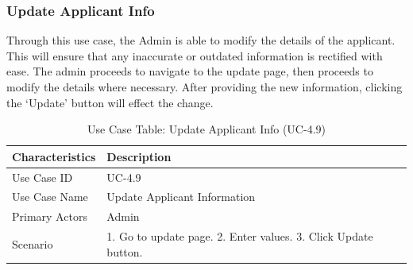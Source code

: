 \subsubsection{Update Applicant Info}
Through this use case, the Admin is able to modify the details of the applicant. This will ensure that any inaccurate or outdated information is rectified with ease. The admin proceeds to navigate to the update page, then proceeds to modify the details where necessary. After providing the new information, clicking the ‘Update’ button will effect the change.
\begin{table}[H]
    \centering
    \small
    \renewcommand{\arraystretch}{1.4}
    \caption{Use Case Table: Update Applicant Info (UC-4.9)} %
    \label{tab:update-applicant-info-admin}
    \begin{tabularx}{\textwidth}{|l|X|}
        \hline
        \rowcolor[gray]{0.9} {Characteristics} & {Description} \\ \hline
        Use Case ID & UC-4.9 \\ \hline
        Use Case Name & Update Applicant Information \\ \hline
        Primary Actors & Admin \\ \hline
        Scenario & 1. Go to update page. 2. Enter values. 3. Click Update button. \\ \hline
    \end{tabularx}
\end{table}
\FloatBarrier
